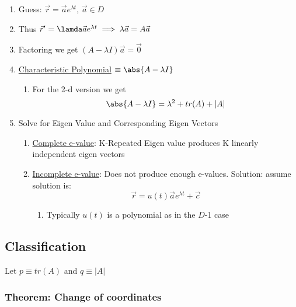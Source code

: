 \documentclass[11pt]{article}
\begin{document}
\begin{enumerate}
\item Guess: $\vec{r} = \vec{a} e^{\lambda t}$, $\vec{a} \in D$
\item Thus $\vec{r}' = \lamda \vec{a} e^{\lambda t} \implies \lambda
      \vec{a} = A \vec{a}$
\item Factoring we get $(A-\lambda I)\vec{a} = \vec{0}$
\item \underline{Characteristic Polynomial} $\equiv \abs{A-\lambda I}$

\begin{enumerate}
\item For the 2-d version we get
         \begin{equation}
         \abs{A-\lambda I} = \lambda^2 + tr(A) + |A|
         \end{equation}
\end{enumerate}

\item Solve for Eigen Value and Corresponding Eigen Vectors

\begin{enumerate}
\item \underline{Complete e-value}: K-Repeated Eigen value produces K linearly
         independent eigen vectors
\item \underline{Incomplete e-value}: Does not produce enough
         e-values. Solution: assume solution is:
         \begin{equation}
         \vec{r} = u(t)\vec{a}e^{\lambda t} + \vec{c}
         \end{equation}

\begin{enumerate}
\item Typically $u(t)$ is a polynomial as in the $D$-1 case
\end{enumerate}

\end{enumerate}

\end{enumerate}
\subsection{Classification}
\label{sec-10.3}

   Let $p\equiv tr(A)$ and $q\equiv |A|$

\subsubsection{Theorem: Change of coordinates}
\label{sec-10.3.1}
\end{document}
